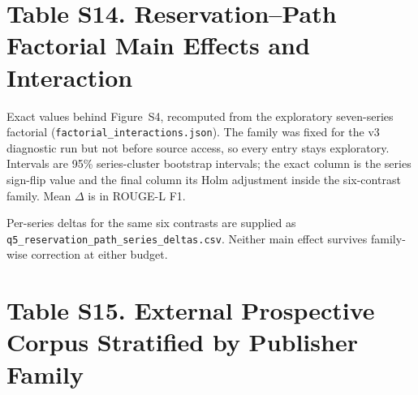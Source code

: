 \documentclass[11pt]{article}
\begin{document}


\section*{Table S14. Reservation--Path Factorial Main Effects and Interaction}

Exact values behind Figure~S4, recomputed from the exploratory seven-series factorial (\nolinkurl{factorial_interactions.json}). The family was fixed for the v3 diagnostic run but not before source access, so every entry stays exploratory. Intervals are 95\% series-cluster bootstrap intervals; the exact column is the series sign-flip value and the final column its Holm adjustment inside the six-contrast family. Mean $\Delta$ is in ROUGE-L F1.

\begin{center}
\small
{}
\end{center}

Per-series deltas for the same six contrasts are supplied as \nolinkurl{q5\_reservation\_path\_series\_deltas.csv}. Neither main effect survives family-wise correction at either budget.


\section*{Table S15. External Prospective Corpus Stratified by Publisher Family}
\end{document}
